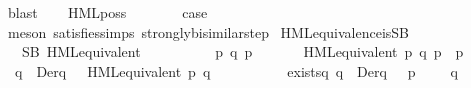 \begin{isabellebody}
\ blast\isanewline
{}\isamarkupfalse%
\isanewline
\ \ \isamarkupfalse%
\ {\isacharparenleft}{\kern0pt}HML{\isacharunderscore}{\kern0pt}poss\ {\isasymalpha}\ {\isasymphi}{\isacharparenright}{\kern0pt}\isanewline
\ \ \isamarkupfalse%
\ \isamarkupfalse%
\ {\isacharquery}{\kern0pt}case\isanewline
\ \ \ \ \isamarkupfalse%
\ {\isacharparenleft}{\kern0pt}meson\ satisfies{\isachardot}{\kern0pt}simps{\isacharparenleft}{\kern0pt}{}{\isacharparenright}{\kern0pt}\ strongly{\isacharunderscore}{\kern0pt}bisimilar{\isacharunderscore}{\kern0pt}step{\isacharparenleft}{\kern0pt}{}{\isacharparenright}{\kern0pt}{\isacharparenright}{\kern0pt}\isanewline
{}\isamarkupfalse%
%
\endisatagproof
{\isafoldproof}%
%
\isadelimproof
\isanewline
%
\endisadelimproof
\isanewline
%
\isadelimvisible
\isanewline
%
\endisadelimvisible
%
\isatagvisible
{}\isamarkupfalse%
\ HML{\isacharunderscore}{\kern0pt}equivalence{\isacharunderscore}{\kern0pt}is{\isacharunderscore}{\kern0pt}SB{\isacharcolon}{\kern0pt}\isanewline
\ \ \ {\isacartoucheopen}SB\ HML{\isacharunderscore}{\kern0pt}equivalent{\isacartoucheclose}\isanewline
{}\isamarkupfalse%
\ {\isacharminus}{\kern0pt}\isanewline
\ \ \isacommand{{\isacharbraceleft}{\kern0pt}}\isamarkupfalse%
\isanewline
\ \ \ \ \isamarkupfalse%
\ p\ q\ p{\isacharprime}{\kern0pt}\ {\isasymalpha}\isanewline
\ \ \ \ \isamarkupfalse%
\ {\isacartoucheopen}HML{\isacharunderscore}{\kern0pt}equivalent\ p\ q{\isacartoucheclose}\ {\isacartoucheopen}p\ {\isasymlongmapsto}{\isasymalpha}\ p{\isacharprime}{\kern0pt}{\isacartoucheclose}\isanewline
\ \ \ \ \isamarkupfalse%
\ {\isacartoucheopen}{\isasymforall}\ q{\isacharprime}{\kern0pt}\ {\isasymin}\ Der{\isacharparenleft}{\kern0pt}q{\isacharcomma}{\kern0pt}\ {\isasymalpha}{\isacharparenright}{\kern0pt}{\isachardot}{\kern0pt}\ {\isasymnot}\ HML{\isacharunderscore}{\kern0pt}equivalent\ p{\isacharprime}{\kern0pt}\ q{\isacharprime}{\kern0pt}{\isacartoucheclose}\isanewline
\ \ \ \ \isanewline
\ \ \ \ \isamarkupfalse%
\ {\isachardoublequoteopen}exists{\isacharunderscore}{\kern0pt}{\isasymphi}\isactrlbsub q{\isacharprime}{\kern0pt}\isactrlesub {\isachardoublequoteclose}{\isacharcolon}{\kern0pt}\ {\isacartoucheopen}{\isasymforall}q{\isacharprime}{\kern0pt}\ {\isasymin}\ Der{\isacharparenleft}{\kern0pt}q{\isacharcomma}{\kern0pt}\ {\isasymalpha}{\isacharparenright}{\kern0pt}{\isachardot}{\kern0pt}\ {\isasymexists}{\isasymphi}{\isachardot}{\kern0pt}\ p{\isacharprime}{\kern0pt}\ {\isasymTurnstile}\ {\isasymphi}\ {\isasymand}\ {\isasymnot}\ q{\isacharprime}{\kern0pt}\ {\isasymTurnstile}\ {\isasymphi}{\isacartoucheclose}\isanewline

\end{isabellebody}

